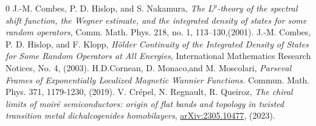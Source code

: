 \documentclass[reqno,12pt,letterpaper]{amsart}
\def\arXiv#1{\href{http://arxiv.org/abs/#1}{arXiv:#1}}
\numberwithin{equation}{section}
\begin{document}
\begin{thebibliography}{0}
 J.-M. Combes, P. D. Hislop, and S. Nakamura, \emph{The $L^p$-theory of the spectral shift function, the Wegner estimate, and the integrated density of states for some random operators}, Comm. Math. Phys. 218, no. 1, 113–130,(2001).
 J.-M. Combes, P. D. Hislop, and F. Klopp, \emph{H\"older Continuity of the Integrated Density of States for Some Random Operators at All Energies}, International Mathematics Research Notices, No. 4,  (2003).
H.D.Cornean, D. Monaco,and M. Moscolari, \emph{Parseval Frames of Exponentially Localized Magnetic Wannier Functions.} Commun. Math. Phys. 371, 1179-1230, (2019).
V. Crépel, N. Regnault, R. Queiroz, \emph{The chiral limits of moir\'e semiconductors: origin of flat bands and topology in twisted transition metal dichalcogenides homobilayers}, \arXiv{2305.10477}, (2023).


\end{thebibliography}
\end{document}
